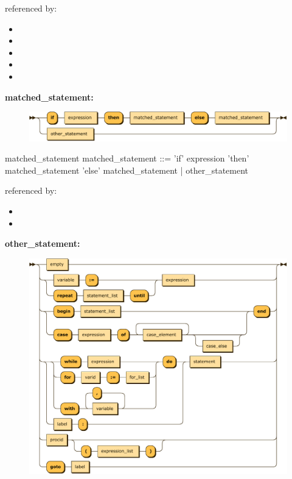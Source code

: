 \documentclass[10pt,a4paper,twoside]{article}
\providecommand{\tightlist}{%
  \setlength{\itemsep}{0pt}\setlength{\parskip}{0pt}}
\newcounter{grammarbox}[section]
\begin{document}
referenced by:

\begin{itemize}
\tightlist
\item
\item
\item
\item
\item
\end{itemize}

\textbf{matched\_statement:}

\begin{figure}[H]
\centering
  \includegraphics[width=1.0\textwidth]{diagram/matched_statement.pdf}

\end{figure}

\begin{grammarbox}{matched\_statement}
\vspace{0.5em}
matched\_statement
         ::= 'if' expression 'then' matched\_statement 'else' matched\_statement
           | other\_statement
\end{grammarbox}

referenced by:

\begin{itemize}
\tightlist
\item
\item
\end{itemize}

\textbf{other\_statement:}

\begin{figure}[H]
\centering
  \includegraphics[width=1.0\textwidth]{diagram/other_statement.pdf}

\end{figure}
\end{document}
